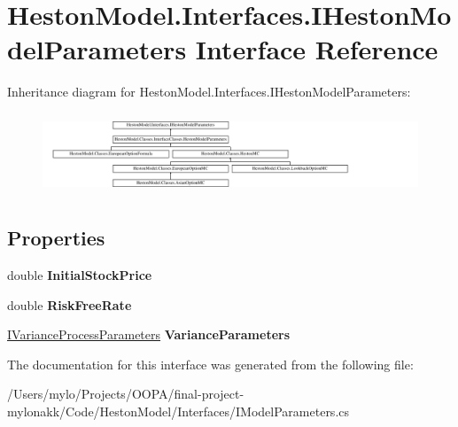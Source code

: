 \hypertarget{interface_heston_model_1_1_interfaces_1_1_i_heston_model_parameters}{}\section{Heston\+Model.\+Interfaces.\+I\+Heston\+Model\+Parameters Interface Reference}
\label{interface_heston_model_1_1_interfaces_1_1_i_heston_model_parameters}
Inheritance diagram for Heston\+Model.\+Interfaces.\+I\+Heston\+Model\+Parameters\+:\begin{figure}[H]
\begin{center}
\leavevmode
\includegraphics[height=2.443281cm]{interface_heston_model_1_1_interfaces_1_1_i_heston_model_parameters}
\end{center}
\end{figure}
\subsection*{Properties}
\begin{DoxyCompactItemize}
\item 
\mbox{\label{interface_heston_model_1_1_interfaces_1_1_i_heston_model_parameters_a4f92094c48523f64d10eba20cc783c5e}} 
double {\bfseries Initial\+Stock\+Price}
\item 
\mbox{\label{interface_heston_model_1_1_interfaces_1_1_i_heston_model_parameters_a0eb2c21079fdaa49221fafd0564197e9}} 
double {\bfseries Risk\+Free\+Rate}
\item 
\mbox{\label{interface_heston_model_1_1_interfaces_1_1_i_heston_model_parameters_af433dc345543754aac82c36694da55d6}} 
\mbox{\hyperlink{interface_heston_model_1_1_interfaces_1_1_i_variance_process_parameters}{I\+Variance\+Process\+Parameters}} {\bfseries Variance\+Parameters}
\end{DoxyCompactItemize}


The documentation for this interface was generated from the following file\+:\begin{DoxyCompactItemize}
\item 
/\+Users/mylo/\+Projects/\+O\+O\+P\+A/final-\/project-\/mylonakk/\+Code/\+Heston\+Model/\+Interfaces/I\+Model\+Parameters.\+cs\end{DoxyCompactItemize}
